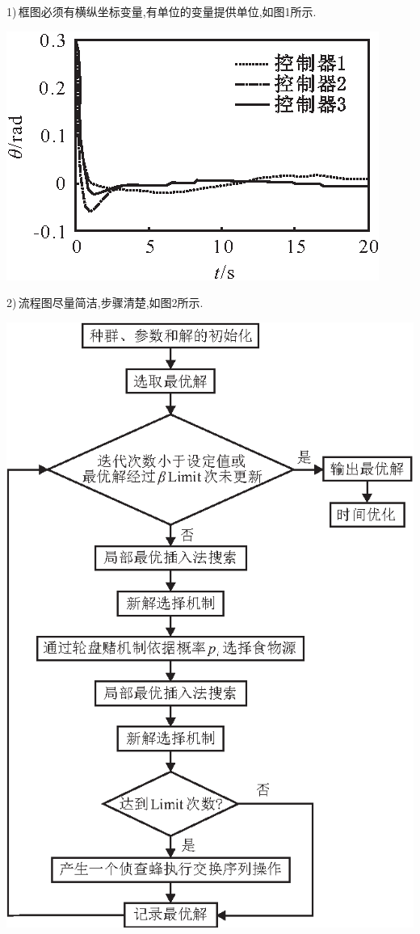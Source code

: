 \documentclass{ctacn}%
\begin{document}
\begin{multicols}{2}
1)\,框图必须有横纵坐标变量,有单位的变量提供单位,如图1所示.
\begin{center}
	\includegraphics[scale=1,trim=0 0 0 0]{template-1}\\
	\label{Fig1}
\end{center}

2)\,流程图尽量简洁,步骤清楚,如图2所示.\vspace{10pt}
\begin{center}
	\includegraphics[scale=1,trim=0 0 0 0]{template-2}\\
	\label{Fig1}
\end{center}


\end{multicols}
\end{document}
